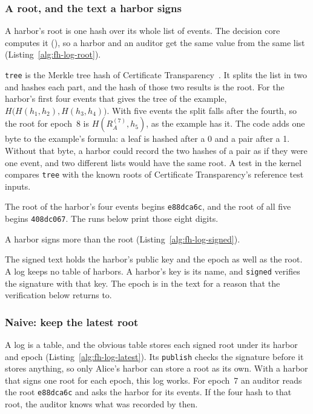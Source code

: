 \subsubsection{A root, and the text a harbor signs}

A harbor's root is one hash over its whole list of events. The decision
core computes it (), so a
harbor and an auditor get the same value from the same list
(Listing~\ref{alg:fh-log-root}).


\texttt{tree} is the Merkle tree hash of Certificate
Transparency~. It splits the list in two and hashes
each part, and the hash of those two results is the root. For the harbor's
first four events that gives the tree of the example,
$H\bigl(H(h_1,h_2),H(h_3,h_4)\bigr)$. With five events the split falls
after the fourth, so the root for epoch~8 is $H(R_A^{(7)},h_5)$, as the
example has it. The code adds one byte to the example's formula: a leaf is
hashed after a 0 and a pair after a 1. Without that byte, a harbor could
record the two hashes of a pair as if they were one event, and two
different lists would have the same root. A test in the kernel compares
\texttt{tree} with the known roots of Certificate Transparency's
reference test inputs.

The root of the harbor's four events begins \texttt{e88dca6c}, and the
root of all five begins \texttt{408dc067}. The runs below print those
eight digits.

A harbor signs more than the root (Listing~\ref{alg:fh-log-signed}).


The signed text holds the harbor's public key and the epoch as well as the
root. A log keeps no table of harbors. A harbor's key is its name, and
\texttt{signed} verifies the signature with that key. The epoch is in the
text for a reason that the verification below returns to.

\subsubsection{Naive: keep the latest root}

A log is a table, and the obvious table stores each signed root under its
harbor and epoch (Listing~\ref{alg:fh-log-latest}). Its \texttt{publish}
checks the signature before it stores anything, so only Alice's harbor
can store a root as its own. With a harbor that signs one root for each
epoch, this log works. For epoch~7 an auditor reads the root
\texttt{e88dca6c} and asks the harbor for its events. If the four hash to
that root, the auditor knows what was recorded by then.

